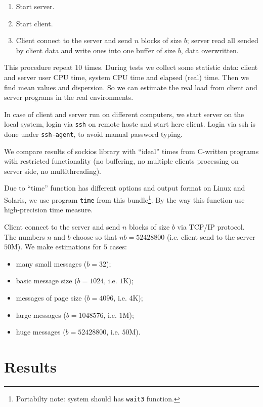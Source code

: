 \documentclass[a4paper]{article}
\begin{document}
\begin{enumerate}
  \item Start server.
  \item Start client.
  \item Client connect to the server and send $n$ blocks of size $b$;
        server read all sended by client data and write ones into one
        buffer of size $b$, data overwritten.
\end{enumerate}

This procedure repeat $10$ times. During tests we collect some statistic
data: client and server user CPU time, system CPU time and elapsed (real) time.
Then we find mean values and dispersion. So we can estimate the real
load from client and server programs in the real environments.

In case of client and server run on different computers, we start server on
the local system, login via \texttt{ssh} on remote hoste and start here client.
Login via ssh is done under \texttt{ssh-agent}, to avoid manual password typing.

We compare results of sockios library with ``ideal'' times from
C-written programs with restricted functionality (no buffering, no multiple
clients processing on server side, no multithreading).

Due to ``time'' function has different options and output format on Linux
and Solaris, we use program \texttt{time} from this
bundle\footnote{Portabilty note: system should has \texttt{wait3} function.}.
By the way this function use high-precision time measure.

Client connect to the server and send $n$ blocks of size $b$ via TCP/IP protocol.
The numbers $n$ and $b$ choose so that $n b = 52428800$ (i.e. client send
to the server $50$M). We make estimations for $5$ cases:
\begin{itemize}
  \item many small messages ($b = 32$);
  \item basic message size ($b = 1024$, i.e. $1$K);
  \item messages of page size ($b = 4096$, i.e. $4$K);
  \item large messages ($b = 1048576$, i.e. $1$M);
  \item huge messages ($b = 52428800$, i.e. $50$M).
\end{itemize}

\section{Results}
\end{document}
